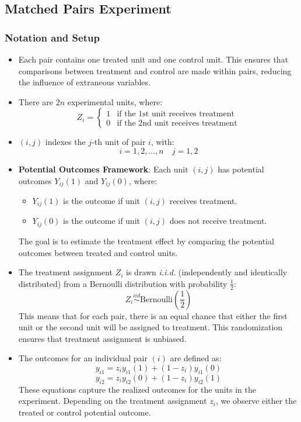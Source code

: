 \subsection{Matched Pairs Experiment}
\subsubsection{Notation and Setup}

\begin{itemize}
    
    \item Each pair contains one treated unit and one control unit. This ensures that comparisons between treatment and control are made within pairs, reducing the influence of extraneous variables.
    
    \item There are $2n$ experimental units, where:
    \[
    Z_i = \begin{cases}
    1 & \text{if the 1st unit receives treatment} \\
    0 & \text{if the 2nd unit receives treatment}
    \end{cases}
    \]
    
    \item $(i, j)$ indexes the $j$-th unit of pair $i$, with:
    \[
    i = 1, 2, \dots, n \quad j = 1, 2
    \]
    
    \item \textbf{Potential Outcomes Framework}: Each unit $(i, j)$ has potential outcomes $Y_{ij}(1)$ and $Y_{ij}(0)$, where:
    \begin{itemize}
        \item $Y_{ij}(1)$ is the outcome if unit $(i,j)$ receives treatment.
        \item $Y_{ij}(0)$ is the outcome if unit $(i,j)$ does not receive treatment.
    \end{itemize}
    The goal is to estimate the treatment effect by comparing the potential outcomes between treated and control units.
    
    \item The treatment assignment $Z_i$ is drawn \textit{i.i.d.} (independently and identically distributed) from a Bernoulli distribution with probability $\frac{1}{2}$:
    \[
    Z_i \overset{iid}{\sim} \text{Bernoulli}\left( \frac{1}{2} \right)
    \]
    This means that for each pair, there is an equal chance that either the first unit or the second unit will be assigned to treatment. This randomization ensures that treatment assignment is unbiased.
    
    \item The outcomes for an individual pair $(i)$ are defined as:
    \[
    y_{i1} = z_i y_{i1}(1) + (1 - z_i) y_{i1}(0)
    \]
    \[
    y_{i2} = z_i y_{i2}(0) + (1 - z_i) y_{i2}(1)
    \]
    These equations capture the realized outcomes for the units in the experiment. Depending on the treatment assignment $z_i$, we observe either the treated or control potential outcome.
    
\end{itemize}

